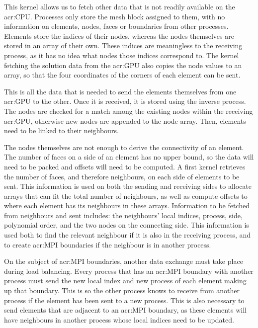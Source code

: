 This kernel allows us to fetch other data that is not readily available on the \acrshort{acr:CPU}.
Processes only store the mesh block assigned to them, with no information on elements, nodes, faces
or boundaries from other processes. Elements store the indices of their nodes, whereas the nodes
themselves are stored in an array of their own. These indices are meaningless to the receiving
process, as it has no idea what nodes those indices correspond to. The kernel fetching the solution
data from the \acrshort{acr:GPU} also copies the node values to an array, so that the four
coordinates of the corners of each element can be sent.

This is all the data that is needed to send the elements themselves from one \acrshort{acr:GPU} to
the other. Once it is received, it is stored using the inverse process. The nodes are checked for a
match among the existing nodes within the receiving \acrshort{acr:GPU}, otherwise new nodes are
appended to the node array. Then, elements need to be linked to their neighbours. 

The nodes themselves are not enough to derive the connectivity of an element. The number of faces on
a side of an element has no upper bound, so the data will need to be packed and offsets will need to
be computed. A first kernel retrieves the number of faces, and therefore neighbours, on each side of
elements to be sent. This information is used on both the sending and receiving sides to allocate
arrays that can fit the total number of neighbours, as well as compute offsets to where each element
has its neighbours in these arrays. Information to be fetched from neighbours and sent includes: the
neighbours' local indices, process, side, polynomial order, and the two nodes on the connecting
side. This information is used both to find the relevant neighbour if it is also in the receiving
process, and to create \acrshort{acr:MPI} boundaries if the neighbour is in another process.

On the subject of \acrshort{acr:MPI} boundaries, another data exchange must take place during load
balancing. Every process that has an \acrshort{acr:MPI} boundary with another process must send the
new local index and new process of each element making up that boundary. This is so the other
process knows to receive from another process if the element has been sent to a new process. This is
also necessary to send elements that are adjacent to an \acrshort{acr:MPI} boundary, as these
elements will have neighbours in another process whose local indices need to be updated.

